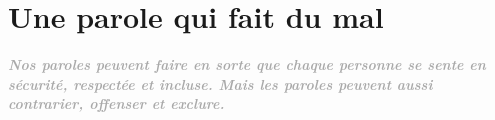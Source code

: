 \documentclass[12pt,openany]{book}
\renewenvironment{quote}{%
  \list{}{%
    \leftmargin-0.1cm   %
    \rightmargin\leftmargin
  }
  \item\relax
}
{\endlist}
\begin{document}
\bigskip
\bigskip

\begin{figure}[h]
    \centering
\end{figure}

\chapter*{Une parole qui fait du mal}

\begin{figure}[h]
    \centering
\end{figure}

\begingroup
\begin{quote}
\centering
\doublespacing
\textit{\Large \textbf{\textcolor{darkgray}{Nos paroles peuvent faire en sorte que chaque personne se sente en sécurité, respectée et incluse. Mais les paroles peuvent aussi contrarier, offenser et exclure.}}}
\end{quote}
\endgroup
\end{document}
